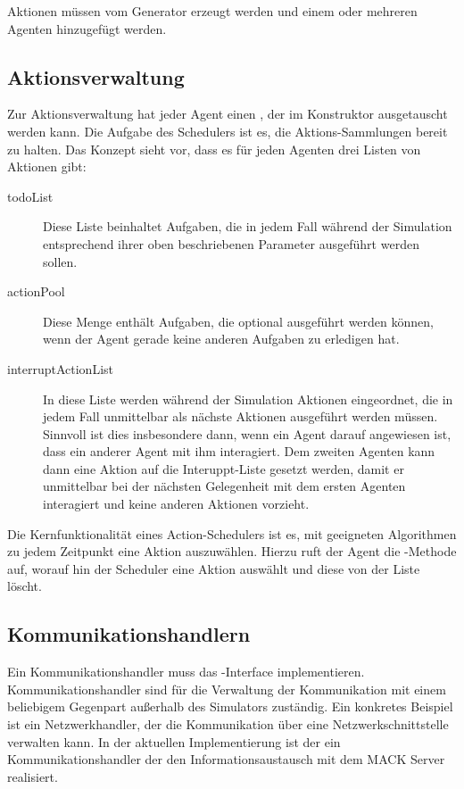 Aktionen müssen vom Generator erzeugt werden und einem oder mehreren Agenten hinzugefügt werden.

\subsection{Aktionsverwaltung}\label{subsec:concept_actionhandling}
Zur Aktionsverwaltung hat jeder Agent einen , der im Konstruktor ausgetauscht werden kann. Die Aufgabe des Schedulers ist es, die Aktions-Sammlungen bereit zu halten. Das Konzept sieht vor, dass es für jeden Agenten drei Listen von Aktionen gibt:
\begin{description}
	\item[todoList] Diese Liste beinhaltet Aufgaben, die in jedem Fall während der Simulation entsprechend ihrer oben beschriebenen Parameter ausgeführt werden sollen.
	\item[actionPool] Diese Menge enthält Aufgaben, die optional ausgeführt werden können, wenn der Agent gerade keine anderen Aufgaben zu erledigen hat.
	\item[interruptActionList] In diese Liste werden während der Simulation Aktionen eingeordnet, die in jedem Fall unmittelbar als nächste Aktionen ausgeführt werden müssen. Sinnvoll ist dies insbesondere dann, wenn ein Agent darauf angewiesen ist, dass ein anderer Agent mit ihm interagiert. Dem zweiten Agenten kann dann eine Aktion auf die Interuppt-Liste gesetzt werden, damit er unmittelbar bei der nächsten Gelegenheit mit dem ersten Agenten interagiert und keine anderen Aktionen vorzieht.
\end{description}

Die Kernfunktionalität eines Action-Schedulers ist es, mit geeigneten Algorithmen zu jedem Zeitpunkt eine Aktion auszuwählen. Hierzu ruft der Agent die -Methode auf, worauf hin der Scheduler eine Aktion auswählt und diese von der Liste löscht.


\subsection{Kommunikationshandlern}\label{subsec:concept_communication}
Ein Kommunikationshandler muss das -Interface implementieren. Kommunikationshandler sind für die Verwaltung der Kommunikation mit einem beliebigem Gegenpart außerhalb des Simulators zuständig. Ein konkretes Beispiel ist ein Netzwerkhandler, der die Kommunikation über eine Netzwerkschnittstelle verwalten kann. In der aktuellen Implementierung ist der  ein Kommunikationshandler der den Informationsaustausch mit dem MACK Server realisiert.

